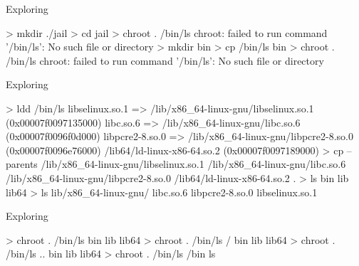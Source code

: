 \documentclass{slide}
\begin{document}

\begin{frame}[fragile]{Exploring }
    \begin{code}[numbers=none]{}
> mkdir ./jail
> cd jail
> chroot . /bin/ls
chroot: failed to run command '/bin/ls': No such file or directory
> mkdir bin
> cp /bin/ls bin
> chroot . /bin/ls
chroot: failed to run command '/bin/ls': No such file or directory
    \end{code}
\end{frame}

\begin{frame}[fragile]{Exploring }
    \vspace{-0.5em}
    \begin{code}[numbers=none]{}
> ldd /bin/ls
    libselinux.so.1 => /lib/x86_64-linux-gnu/libselinux.so.1 (0x00007f0097135000)
    libc.so.6 => /lib/x86_64-linux-gnu/libc.so.6 (0x00007f0096f0d000)
    libpcre2-8.so.0 => /lib/x86_64-linux-gnu/libpcre2-8.so.0 (0x00007f0096e76000)
    /lib64/ld-linux-x86-64.so.2 (0x00007f0097189000)
> cp --parents /lib/x86_64-linux-gnu/libselinux.so.1 /lib/x86_64-linux-gnu/libc.so.6 /lib/x86_64-linux-gnu/libpcre2-8.so.0 /lib64/ld-linux-x86-64.so.2 .
> ls
bin  lib  lib64
> ls lib/x86_64-linux-gnu/
libc.so.6  libpcre2-8.so.0  libselinux.so.1
    \end{code}
\end{frame}

\begin{frame}[fragile]{Exploring }
    \begin{code}[numbers=none]{}
> chroot . /bin/ls
bin  lib  lib64
> chroot . /bin/ls /
bin  lib  lib64
> chroot . /bin/ls ..
bin  lib  lib64
> chroot . /bin/ls /bin
ls
    \end{code}
\end{frame}
\end{document}
